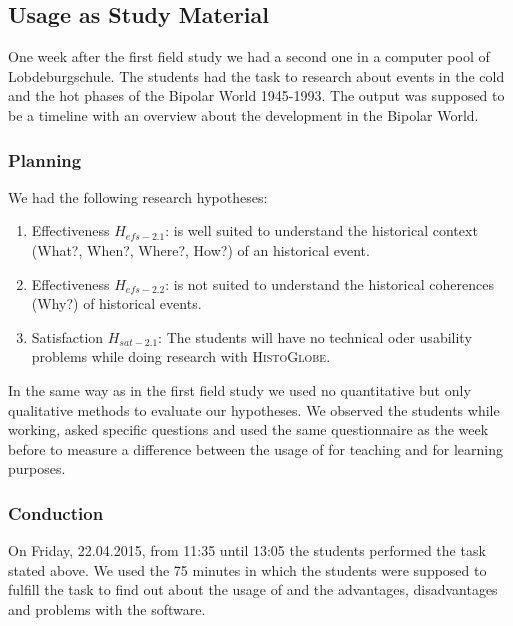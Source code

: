 

\subsection{Usage as Study Material} %
\label{sub:usage_as_study_material}

One week after the first field study we had a second one in a computer pool of Lobdeburgschule. The students had the task to research about events in the cold and the hot phases of the Bipolar World 1945-1993. The output was supposed to be a timeline with an overview about the development in the Bipolar World.

\subsubsection{Planning} %
\label{ssub:planning-2}

We had the following research hypotheses:
\begin{enumerate}
  \item Effectiveness $H_{efs-2.1}$: \HG is well suited to understand the historical context (What?, When?, Where?, How?) of an historical event.
  \item Effectiveness $H_{efs-2.2}$: \HG is not suited to understand the historical coherences (Why?) of historical events.
  \item Satisfaction $H_{sat-2.1}$: The students will have no technical oder usability problems while doing research with \textsc{HistoGlobe}.
\end{enumerate}

In the same way as in the first field study we used no quantitative but only qualitative methods to evaluate our hypotheses. We observed the students while working, asked specific questions and used the same questionnaire as the week before to measure a difference between the usage of \HG for teaching and for learning purposes.


\subsubsection{Conduction} %
\label{ssub:conduction-2}
On Friday, 22.04.2015, from 11:35 until 13:05 the students performed the task stated above. We used the 75 minutes in which the students were supposed to fulfill the task to find out about the usage of \HG and the advantages, disadvantages and problems with the software.

